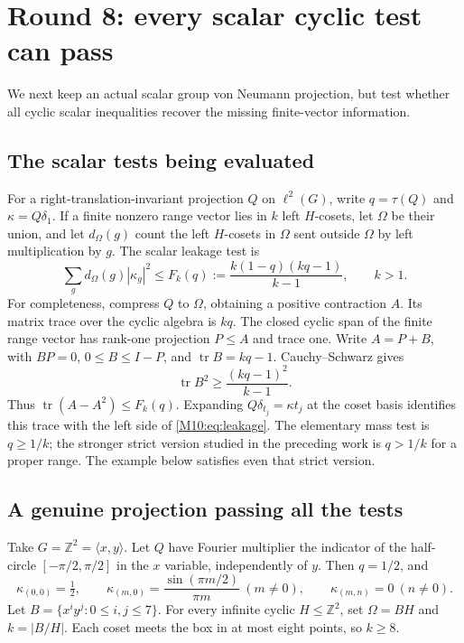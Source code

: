 \documentclass[11pt,a4paper,oneside]{report}
\theoremstyle{definition}
\theoremstyle{remark}
\newcommand{\Z}{\mathbb Z}
\begin{document}
\section{Round 8: every scalar cyclic test can pass}
We next keep an actual scalar group von Neumann projection, but
test whether all cyclic scalar inequalities recover the missing
finite-vector information.

\subsection{The scalar tests being evaluated}
For a right-translation-invariant projection $Q$ on $\ell^2(G)$,
write $q=\tau(Q)$ and $\kappa=Q\delta_1$.
If a finite nonzero range vector lies in $k$ left $H$-cosets,
let $\Omega$ be their union, and let $d_\Omega(g)$ count the
left $H$-cosets in $\Omega$ sent outside $\Omega$ by left
multiplication by $g$. The scalar leakage test is
\begin{equation}\label{M10:eq:leakage}
\sum_g d_\Omega(g)|\kappa_g|^2
\le F_k(q):=\frac{k(1-q)(kq-1)}{k-1},\qquad k>1.
\end{equation}
For completeness, compress $Q$ to $\Omega$, obtaining a positive
contraction $A$. Its matrix trace over the cyclic algebra is $kq$.
The closed cyclic span of the finite range vector has rank-one
projection $P\le A$ and trace one. Write $A=P+B$, with
$BP=0$, $0\le B\le I-P$, and $\operatorname{tr}B=kq-1$.
Cauchy--Schwarz gives
\[
\operatorname{tr}B^2\ge\frac{(kq-1)^2}{k-1}.
\]
Thus $\operatorname{tr}(A-A^2)\le F_k(q)$.
Expanding $Q\delta_{t_j}=\kappa t_j$ at the coset basis
identifies this trace with the left side of \eqref{M10:eq:leakage}.
The elementary mass test is $q\ge1/k$; the stronger strict
version studied in the preceding work is $q>1/k$ for a proper
range. The example below satisfies even that strict version.

\subsection{A genuine projection passing all the tests}
Take $G=\Z^2=\langle x,y\rangle$. Let $Q$ have Fourier multiplier
the indicator of the half-circle $[-\pi/2,\pi/2]$ in the
$x$ variable, independently of $y$. Then $q=1/2$, and
\[
\kappa_{(0,0)}=\tfrac12,\qquad
\kappa_{(m,0)}=\frac{\sin(\pi m/2)}{\pi m}\ (m\ne0),
\qquad \kappa_{(m,n)}=0\ (n\ne0).
\]
Let $B=\{x^iy^j:0\le i,j\le7\}$.
For every infinite cyclic $H\le\Z^2$, set $\Omega=BH$ and
$k=|B/H|$. Each coset meets the box in at most eight points,
so $k\ge8$.
\end{document}
